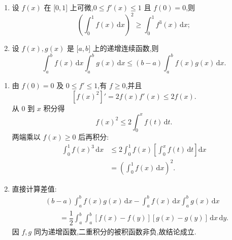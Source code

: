\begin{example}
    \begin{enumerate}
        \item 设 $f(x)$ 在 $\lbrack 0,1\rbrack$ 上可微,$0\leq f'(x)\leq1$ 且 $f(0)=0$,则
              \[
                  \left(\int_0^1f(x)\,\mathrm{d}x\right)^2
                  \geq\int_0^1f^3(x)\,\mathrm{d}x;
              \]
        \item 设 $f(x),g(x)$ 是 $\lbrack a,b\rbrack$ 上的递增连续函数,则
              \[
                  \displaystyle\int_a^bf(x)\,\mathrm{d}x\int_a^bg(x)\,\mathrm{d}x
                  \leq(b-a)\int_a^bf(x)g(x)\,\mathrm{d}x.
              \]
    \end{enumerate}
\end{example}
\exampleblank

\begin{solution}
    \leavevmode
    \begin{enumerate}
        \item 由 $f(0)=0$ 及 $0\leq f'\leq1$,有 $f\geq0$,并且
              \[
                  [f(x)^2]'=2f(x)f'(x)\leq2f(x).
              \]
              从 $0$ 到 $x$ 积分得
              \[
                  f(x)^2\leq2\int_0^xf(t)\,\mathrm{d}t.
              \]
              两端乘以 $f(x)\geq0$ 后再积分:
              \[
                  \begin{aligned}
                      \int_0^1f(x)^3\,\mathrm{d}x
                       & \leq2\int_0^1f(x)
                      \left[\int_0^xf(t)\,\mathrm{d}t\right]\mathrm{d}x \\
                       & =\left(\int_0^1f(x)\,\mathrm{d}x\right)^2.
                  \end{aligned}
              \]

        \item 直接计算差值:
              \[
                  \begin{aligned}
                       & (b-a)\int_a^bf(x)g(x)\,\mathrm{d}x
                      -\int_a^bf(x)\,\mathrm{d}x\int_a^bg(x)\,\mathrm{d}x \\
                       & \qquad=\dfrac{1}{2}\int_a^b\int_a^b
                      [f(x)-f(y)][g(x)-g(y)]\,\mathrm{d}x\,\mathrm{d}y.
                  \end{aligned}
              \]
              因 $f,g$ 同为递增函数,二重积分的被积函数非负,故结论成立.
    \end{enumerate}
\end{solution}


